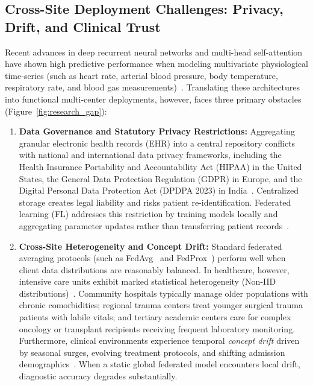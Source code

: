 \documentclass[11pt,a4paper]{article}
\begin{document}
\subsection{Cross-Site Deployment Challenges: Privacy, Drift, and Clinical Trust}
Recent advances in deep recurrent neural networks and multi-head self-attention have shown high predictive performance when modeling multivariate physiological time-series (such as heart rate, arterial blood pressure, body temperature, respiratory rate, and blood gas measurements)~\cite{shashikumar2021deepai,futoma2017learning}. Translating these architectures into functional multi-center deployments, however, faces three primary obstacles (Figure~\ref{fig:research_gap}):
\begin{enumerate}[leftmargin=*]
    \item \textbf{Data Governance and Statutory Privacy Restrictions:} Aggregating granular electronic health records (EHR) into a central repository conflicts with national and international data privacy frameworks, including the Health Insurance Portability and Accountability Act (HIPAA) in the United States, the General Data Protection Regulation (GDPR) in Europe, and the Digital Personal Data Protection Act (DPDPA 2023) in India~\cite{rieke2020future,kaissis2020trustworthy}. Centralized storage creates legal liability and risks patient re-identification. Federated learning (FL) addresses this restriction by training models locally and aggregating parameter updates rather than transferring patient records~\cite{mcmahan2017,dayan2021exam}.
    \item \textbf{Cross-Site Heterogeneity and Concept Drift:} Standard federated averaging protocols (such as FedAvg~\cite{mcmahan2017} and FedProx~\cite{li2020fedprox}) perform well when client data distributions are reasonably balanced. In healthcare, however, intensive care units exhibit marked statistical heterogeneity (Non-IID distributions)~\cite{yuan2024trend,wang2025personalized}. Community hospitals typically manage older populations with chronic comorbidities; regional trauma centers treat younger surgical trauma patients with labile vitals; and tertiary academic centers care for complex oncology or transplant recipients receiving frequent laboratory monitoring. Furthermore, clinical environments experience temporal \textit{concept drift} driven by seasonal surges, evolving treatment protocols, and shifting admission demographics~\cite{jothimurugesan2022,bernardi2023adaptive}. When a static global federated model encounters local drift, diagnostic accuracy degrades substantially.

\end{enumerate}
\end{document}
